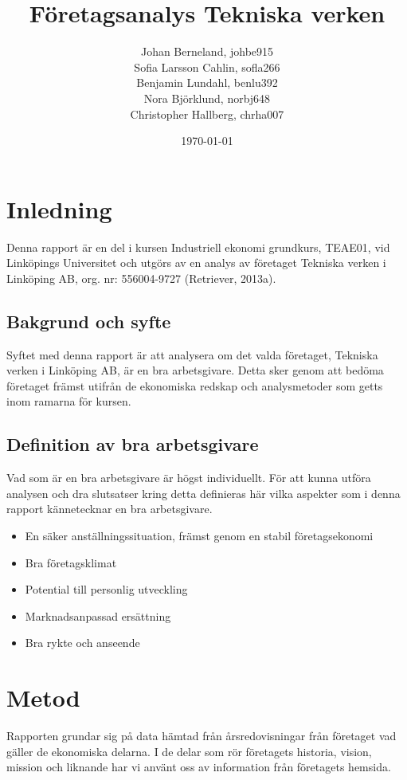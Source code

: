 \documentclass[10pt,a4paper]{article}
\title{Företagsanalys Tekniska verken}
\author{Johan Berneland, johbe915\\Sofia Larsson Cahlin, sofla266\\Benjamin Lundahl, benlu392\\
    Nora Björklund, norbj648\\Christopher Hallberg, chrha007}
\date{\today}
\begin{document}
\maketitle

\newpage

\tableofcontents

\newpage

\section{Inledning}
Denna rapport är en del i kursen Industriell ekonomi grundkurs, TEAE01, vid
Linköpings Universitet och utgörs av en analys av företaget Tekniska verken
i Linköping AB, org. nr: 556004-9727 (Retriever, 2013a).

\subsection{Bakgrund och syfte}
Syftet med denna rapport är att analysera om det valda företaget, Tekniska verken i Linköping AB, är en bra arbetsgivare. Detta sker genom att bedöma företaget främst utifrån de ekonomiska redskap och analysmetoder som getts inom ramarna för kursen. 

\subsection{Definition av bra arbetsgivare}
Vad som är en bra arbetsgivare är högst individuellt. För att kunna utföra analysen och dra slutsatser kring detta definieras här vilka aspekter som i denna rapport kännetecknar en bra arbetsgivare.

\begin{itemize}
 \item En säker anställningssituation, främst genom en stabil företagsekonomi 
 \item Bra företagsklimat
 \item Potential till personlig utveckling
 \item Marknadsanpassad ersättning
 \item Bra rykte och anseende
\end{itemize}

\section{Metod}
Rapporten grundar sig på data hämtad från årsredovisningar från företaget vad
gäller de ekonomiska delarna. I de delar som rör företagets historia, vision,
mission och liknande har vi använt oss av information från företagets hemsida.
\end{document}
